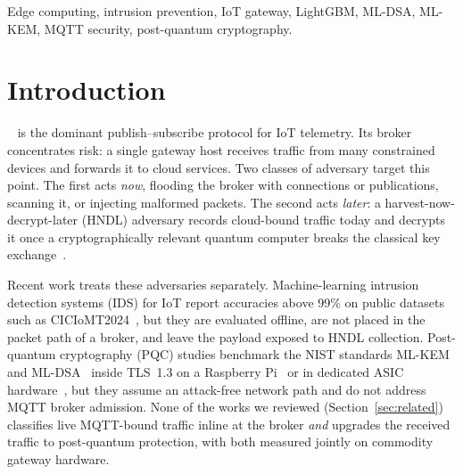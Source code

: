 \documentclass[journal]{IEEEtran}
\begin{document}
\begin{IEEEkeywords}
Edge computing, intrusion prevention, IoT gateway, LightGBM, ML-DSA, ML-KEM, MQTT security, post-quantum cryptography.
\end{IEEEkeywords}

\section{Introduction}
\label{sec:intro}

~\cite{mqtt_oasis} is the dominant publish--subscribe protocol for IoT telemetry. Its broker concentrates risk: a single gateway host receives traffic from many constrained devices and forwards it to cloud services. Two classes of adversary target this point. The first acts \emph{now}, flooding the broker with connections or publications, scanning it, or injecting malformed packets. The second acts \emph{later}: a harvest-now-decrypt-later (HNDL) adversary records cloud-bound traffic today and decrypts it once a cryptographically relevant quantum computer breaks the classical key exchange~\cite{shor1994,mosca2018}.

Recent work treats these adversaries separately. Machine-learning intrusion detection systems (IDS) for IoT report accuracies above 99\% on public datasets such as CICIoMT2024~\cite{ciciomt2024,abid2025gwo,wang2025skd,soomro2025roche}, but they are evaluated offline, are not placed in the packet path of a broker, and leave the payload exposed to HNDL collection. Post-quantum cryptography (PQC) studies benchmark the NIST standards ML-KEM~\cite{nist_fips203} and ML-DSA~\cite{nist_fips204} inside TLS~1.3 on a Raspberry Pi~\cite{shahid2026pqtls} or in dedicated ASIC hardware~\cite{dimatteo2026kem22}, but they assume an attack-free network path and do not address MQTT broker admission. None of the works we reviewed (Section~\ref{sec:related}) classifies live MQTT-bound traffic inline at the broker \emph{and} upgrades the received traffic to post-quantum protection, with both measured jointly on commodity gateway hardware.
\end{document}

